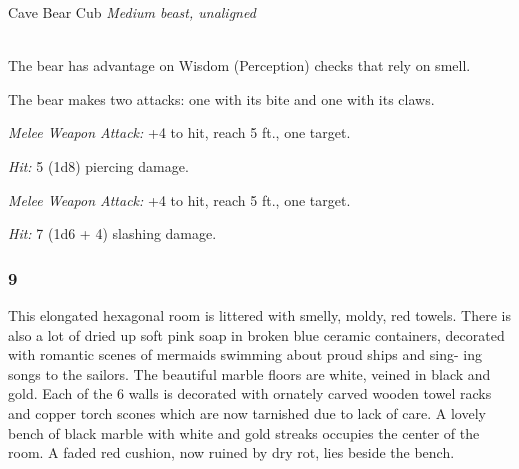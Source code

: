 \documentclass[palace_of_the_silver_princess]{subfiles}
\begin{document}
\begin{monsterbox}{Cave Bear Cub}
    \textit{Medium beast, unaligned}\\
    \hline
    \basics[%
        armorclass = 11,
        hitpoints  = 15,
        speed      = {40 ft., swim 30 ft.}
    ]
    \hline
    \stats[
        STR = \stat{10},
        DEX = \stat{5},
        CON = \stat{8},
        INT = \stat{1},
        WIS = \stat{6},
        CHA = \stat{3}
    ]
    \hline
    \details[
        skills = {Perception +3},
        senses = {darkvision 60 ft., passive Perception 13},
        languages = {---},
        challenge = {1 (200 XP)},
    ]
    \hline
    \\[1mm]
    \begin{monsteraction}
        The bear has advantage on Wisdom (Perception) checks
        that rely on smell.
    \end{monsteraction}
    \begin{monsteraction}[Multiattack]
        The bear makes two attacks: one with its bite
        and one with its claws.
    \end{monsteraction}

    \begin{monsteraction}[Bite]
        \textit{Melee Weapon Attack:} +4 to hit, reach 5 ft., one
        target.

        \textit{Hit:} 5 (1d8) piercing damage.
    \end{monsteraction}
    
    \begin{monsteraction}[Claws]
        \textit{Melee Weapon Attack:} +4 to hit, reach 5 ft., one
        target.

        \textit{Hit:} 7 (1d6 + 4) slashing damage.
    \end{monsteraction}
\end{monsterbox}

\subsubsection{9}
\begin{quotebox}
    This elongated hexagonal room is littered with smelly, moldy, red
    towels. There is also a lot of dried up soft pink soap in broken
    blue ceramic containers, decorated with romantic scenes of mermaids
    swimming about proud ships and sing- ing songs to the sailors. The
    beautiful marble floors are white, veined in black and gold. Each of
    the 6 walls is decorated with ornately carved wooden towel racks and
    copper torch scones which are now tarnished due to lack of care. A
    lovely bench of black marble with white and gold streaks occupies
    the center of the room. A faded red cushion, now ruined by dry rot,
    lies beside the bench.
\end{quotebox}
\end{document}
